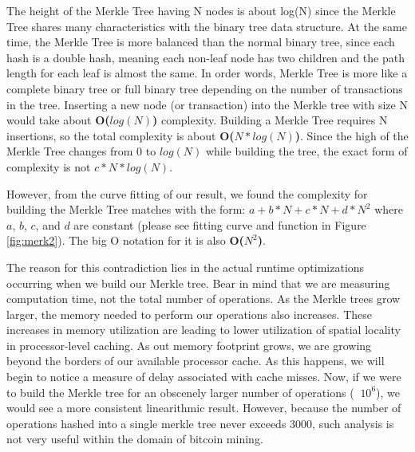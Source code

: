\documentclass[pdftex,11pt]{article}
\begin{document}
The height of the Merkle Tree having N nodes is about log(N) since the Merkle Tree shares many characteristics with the binary tree data structure. At the same time, the Merkle Tree is more balanced than the normal binary tree, since each hash is a double hash, meaning each non-leaf node has two children and the path length for each leaf is almost the same. In order words, Merkle Tree is more like a complete binary tree or full binary tree depending on the number of transactions in the tree. Inserting a new node (or transaction) into the Merkle tree with size N would take about {\bf O($log(N)$)} complexity. Building a Merkle Tree requires N insertions, so the total complexity is about {\bf O($N*log(N)$)}. Since the high of the Merkle Tree changes from 0 to $log(N)$ while building the tree, the exact form of complexity is not $c*N*log(N)$. 

However, from the curve fitting of our result, we found the complexity for building the Merkle Tree matches with the form: $a+b*N+c*N+d*N^2$ where $a$, $b$, $c$, and $d$ are constant (please see fitting curve and function in Figure \ref{fig:merk2}). The big O notation for it is also {\bf O($N^2$)}. 

The reason for this contradiction lies in the actual runtime optimizations occurring when we build our Merkle tree. Bear in mind that we are measuring computation time, not the total number of operations. As the Merkle trees grow larger, the memory needed to perform our operations also increases. These increases in memory utilization are leading to lower utilization of spatial locality in processor-level caching. As out memory footprint grows, we are growing beyond the borders of our available processor cache. As this happens, we will begin to notice a measure of delay associated with cache misses. Now, if we were to build the Merkle tree for an obscenely larger number of operations ($~$ $10^6$), we would see a more consistent linearithmic result. However, because the number of operations hashed into a single merkle tree never exceeds 3000, such analysis is not very useful within the domain of bitcoin mining.
\end{document}
